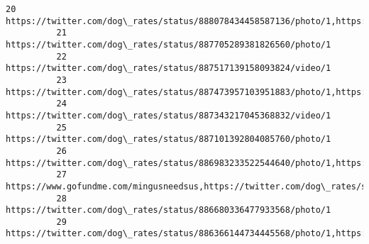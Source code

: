 \documentclass[11pt]{article}
\begin{document}
\begin{Verbatim}[commandchars=\\\{\}]
          20    https://twitter.com/dog\_rates/status/888078434458587136/photo/1,https://twitter.com/dog\_rates/status/888078434458587136/photo/1                                                                                                                                   
          21    https://twitter.com/dog\_rates/status/887705289381826560/photo/1                                                                                                                                                                                                   
          22    https://twitter.com/dog\_rates/status/887517139158093824/video/1                                                                                                                                                                                                   
          23    https://twitter.com/dog\_rates/status/887473957103951883/photo/1,https://twitter.com/dog\_rates/status/887473957103951883/photo/1                                                                                                                                   
          24    https://twitter.com/dog\_rates/status/887343217045368832/video/1                                                                                                                                                                                                   
          25    https://twitter.com/dog\_rates/status/887101392804085760/photo/1                                                                                                                                                                                                   
          26    https://twitter.com/dog\_rates/status/886983233522544640/photo/1,https://twitter.com/dog\_rates/status/886983233522544640/photo/1                                                                                                                                   
          27    https://www.gofundme.com/mingusneedsus,https://twitter.com/dog\_rates/status/886736880519319552/photo/1,https://twitter.com/dog\_rates/status/886736880519319552/photo/1                                                                                            
          28    https://twitter.com/dog\_rates/status/886680336477933568/photo/1                                                                                                                                                                                                   
          29    https://twitter.com/dog\_rates/status/886366144734445568/photo/1,https://twitter.com/dog\_rates/status/886366144734445568/photo/1                                                                                                                                   

\end{Verbatim}
\end{document}
